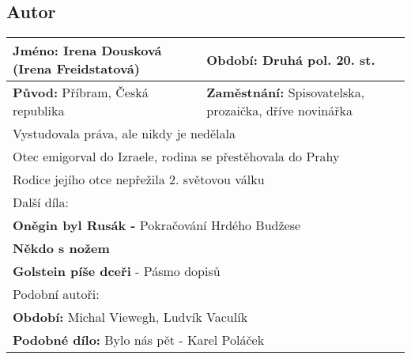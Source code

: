 \subsection*{Autor}
\begin{tabularx}{\linewidth}{l|l}
    \textbf{Jméno:} Irena Dousková (Irena Freidstatová) & \textbf{Období:} Druhá pol. 20. st.                            \\
    \hline
    \textbf{Původ:} Příbram, Česká republika            & \textbf{Zaměstnání:} Spisovatelska, prozaička, dříve novinářka \\
    \hline
    \multicolumn{2}{l}{Vystudovala práva, ale nikdy je nedělala}                                                         \\
    \multicolumn{2}{l}{Otec emigorval do Izraele, rodina se přestěhovala do Prahy}                                       \\
    \multicolumn{2}{l}{Rodice jejího otce nepřežila 2. světovou válku}                                                   \\
    \hline
    \multicolumn{2}{l}{Další díla:}                                                                                      \\
    \multicolumn{2}{l}{\textbf{Oněgin byl Rusák -} Pokračování Hrdého Budžese}                                           \\
    \multicolumn{2}{l}{\textbf{Někdo s nožem}}                                                                           \\
    \multicolumn{2}{l}{\textbf{Golstein píše dceři} - Pásmo dopisů}                                                      \\
    \hline
    \multicolumn{2}{l}{Podobní autoři:}                                                                                  \\
    \multicolumn{2}{l}{\textbf{Období:} Michal Viewegh, Ludvík Vaculík}                                                  \\
    \multicolumn{2}{l}{\textbf{Podobné dílo:} Bylo nás pět - Karel Poláček}                                              \\
\end{tabularx}
